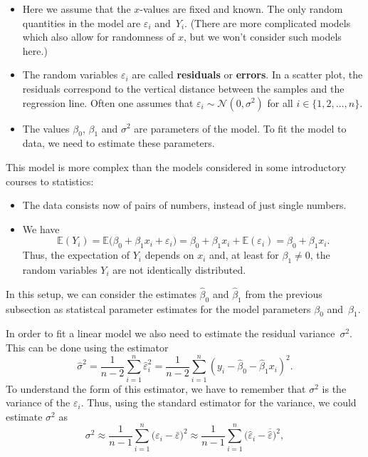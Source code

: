 \documentclass[
  a4paper,
]{article}
\providecommand{\tightlist}{%
  \setlength{\itemsep}{0pt}\setlength{\parskip}{0pt}}
\theoremstyle{definition}
\theoremstyle{definition}
\theoremstyle{definition}
\theoremstyle{definition}
\theoremstyle{remark}
\begin{document}
\begin{itemize}
\tightlist
\item
  Here we assume that the \(x\)-values are fixed and known. The only
  random quantities in the model are \(\varepsilon_i\) and~\(Y_i\). (There are
  more complicated models which also allow for randomness of \(x\), but
  we won't consider such models here.)
\item
  The random variables \(\varepsilon_i\) are called \textbf{residuals} or
  \textbf{errors}. In a scatter plot, the residuals correspond to the
  vertical distance between the samples and the regression line.
  Often one assumes that \(\varepsilon_i \sim \mathcal{N}(0, \sigma^2)\) for all
  \(i \in \{1, 2, \ldots, n\}\).
\item
  The values \(\beta_0\), \(\beta_1\) and \(\sigma^2\) are parameters of
  the model. To fit the model to data, we need to estimate these
  parameters.
\end{itemize}

This model is more complex than the models considered in some
introductory courses to statistics:

\begin{itemize}
\tightlist
\item
  The data consists now of pairs of numbers, instead of just
  single numbers.
\item
  We have
  \begin{equation*}
    \mathbb{E}(Y_i)
    = \mathbb{E}\bigl( \beta_0 + \beta_1 x_i + \varepsilon_i \bigr)
    = \beta_0 + \beta_1 x_i + \mathbb{E}(\varepsilon_i)
    = \beta_0 + \beta_1 x_i.
  \end{equation*}
  Thus, the expectation of \(Y_i\) depends on \(x_i\) and, at least for
  \(\beta_1 \neq 0\), the random variables \(Y_i\) are not identically
  distributed.
\end{itemize}

In this setup, we can consider the estimates \(\hat\beta_0\) and \(\hat\beta_1\)
from the previous subsection as statistcal parameter estimates for the
model parameters \(\beta_0\) and~\(\beta_1\).

In order to fit a linear model we also need to estimate the residual
variance~\(\sigma^2\). This can be done using the estimator
\begin{equation}
  \hat\sigma^2
  = \frac{1}{n-2} \sum_{i=1}^n \hat\varepsilon_i^2
  = \frac{1}{n-2} \sum_{i=1}^n (y_i - \hat\beta_0 - \hat\beta_1 x_i)^2.
  \label{eq:reg-sigma-est}
\end{equation}
To understand the form of this estimator, we have to remember that
\(\sigma^2\) is the variance of the \(\varepsilon_i\). Thus, using the standard
estimator for the variance, we could estimate \(\sigma^2\) as
\begin{equation}
  \sigma^2
  \approx \frac{1}{n-1} \sum_{i=1}^n \bigl(\varepsilon_i - \bar\varepsilon\bigr)^2
  \approx \frac{1}{n-1} \sum_{i=1}^n \bigl(\hat\varepsilon_i - \overline{\hat\varepsilon}\bigr)^2,
  \label{eq:resid-var-est}
\end{equation}
\end{document}
